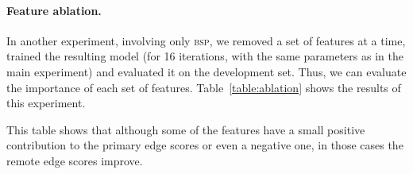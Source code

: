 \documentclass[11pt]{article}
\newcommand{\secref}[1]{Section~\ref{#1}}
\newcommand{\figref}[1]{Figure~\ref{#1}}
\newcommand{\tabref}[1]{Table~\ref{#1}}
\begin{document}
\paragraph{Feature ablation.}

In another experiment, involving only \textsc{bsp}, we removed a set of features at a time, trained the resulting model (for 16 iterations, with the same parameters as in the main experiment) and evaluated it on the development set. Thus, we can evaluate the importance of each set of features. \tabref{table:ablation} shows the results of this experiment.


\begin{table}[ht]
\caption{\small
  Results in percents of the feature ablation experiment.
  See \figref{fig:features} for the definition of each feature set; \textbf{disco} refers to all discontiguous features, and \textbf{ratio} is the number of terminals divided by the total number of nodes (\secref{subsec:features}).
}
\label{table:ablation}
\end{table}

This table shows that although some of the features have a small positive contribution to the primary edge scores or even a negative one, in those cases the remote edge scores improve.
\end{document}
